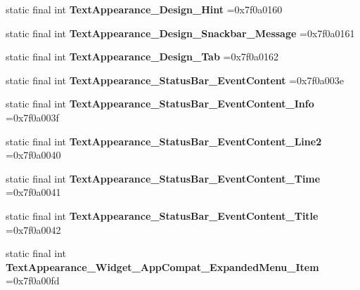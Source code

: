 \begin{DoxyCompactItemize}
static final int {\bfseries Text\+Appearance\+\_\+\+Design\+\_\+\+Hint} =0x7f0a0160
\item 
\mbox{\label{classproject4_1_1xaria_1_1R_1_1style_a86e68848b6d1f54ebe2fa5760780783d}} 
static final int {\bfseries Text\+Appearance\+\_\+\+Design\+\_\+\+Snackbar\+\_\+\+Message} =0x7f0a0161
\item 
\mbox{\label{classproject4_1_1xaria_1_1R_1_1style_a0794da3be83250db04511dc02902be40}} 
static final int {\bfseries Text\+Appearance\+\_\+\+Design\+\_\+\+Tab} =0x7f0a0162
\item 
\mbox{\label{classproject4_1_1xaria_1_1R_1_1style_a6d35a05087130beb235420947344f2f2}} 
static final int {\bfseries Text\+Appearance\+\_\+\+Status\+Bar\+\_\+\+Event\+Content} =0x7f0a003e
\item 
\mbox{\label{classproject4_1_1xaria_1_1R_1_1style_a8d781d9c78b785e6106508b478d9c542}} 
static final int {\bfseries Text\+Appearance\+\_\+\+Status\+Bar\+\_\+\+Event\+Content\+\_\+\+Info} =0x7f0a003f
\item 
\mbox{\label{classproject4_1_1xaria_1_1R_1_1style_abe03e2724161b8f9e292d3acf939e2fb}} 
static final int {\bfseries Text\+Appearance\+\_\+\+Status\+Bar\+\_\+\+Event\+Content\+\_\+\+Line2} =0x7f0a0040
\item 
\mbox{\label{classproject4_1_1xaria_1_1R_1_1style_a0b8109fad7ab30f55d63dd288c550a4d}} 
static final int {\bfseries Text\+Appearance\+\_\+\+Status\+Bar\+\_\+\+Event\+Content\+\_\+\+Time} =0x7f0a0041
\item 
\mbox{\label{classproject4_1_1xaria_1_1R_1_1style_a95951c043638edeb059834f4f56022b1}} 
static final int {\bfseries Text\+Appearance\+\_\+\+Status\+Bar\+\_\+\+Event\+Content\+\_\+\+Title} =0x7f0a0042
\item 
\mbox{\label{classproject4_1_1xaria_1_1R_1_1style_ad61f553c7391c1c94dbbb0a3b6211e47}} 
static final int {\bfseries Text\+Appearance\+\_\+\+Widget\+\_\+\+App\+Compat\+\_\+\+Expanded\+Menu\+\_\+\+Item} =0x7f0a00fd

\end{DoxyCompactItemize}

